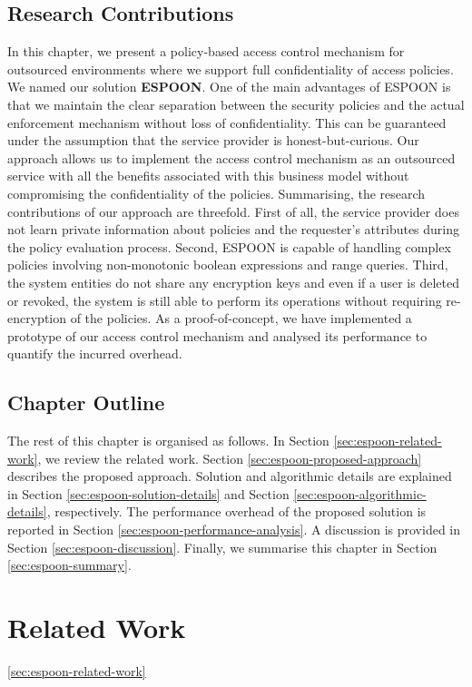\documentclass[epsfig,a4paper,11pt,titlepage]{book}
\numberwithin{algorithm}{chapter}
\begin{document}
\subsection{Research Contributions}
In this chapter, we present a policy-based access control mechanism for outsourced environments where we support full confidentiality of access policies. We named our solution \textbf{\gls{ESPOON}}. One of the main advantages of \gls{ESPOON} is that we maintain the clear separation between the security policies and the actual enforcement mechanism without loss of confidentiality. This can be guaranteed under the assumption that the service provider is honest-but-curious. Our approach allows us to implement the access control mechanism as an outsourced service with all the benefits associated with this business model without compromising the confidentiality of the policies. Summarising, the research contributions of our approach are threefold. First of all, the service provider does not learn private information about policies and the requester's attributes during the policy evaluation process. Second, \gls{ESPOON} is capable of handling complex policies involving non-monotonic boolean expressions and range queries. Third, the system entities do not share any encryption keys and even if a user is deleted or revoked, the system is still able to perform its operations without requiring re-encryption of the policies. As a proof-of-concept, we have implemented a prototype of our access control mechanism and analysed its performance to quantify the incurred overhead.

\subsection{Chapter Outline}
The rest of this chapter is organised as follows. In Section \ref{sec:espoon-related-work}, we review the related work. Section \ref{sec:espoon-proposed-approach} describes the proposed approach. Solution and algorithmic details are explained in Section \ref{sec:espoon-solution-details} and Section \ref{sec:espoon-algorithmic-details}, respectively. The performance overhead of the proposed solution is reported in Section \ref{sec:espoon-performance-analysis}. A discussion is provided in Section \ref{sec:espoon-discussion}. Finally, we summarise this chapter in Section \ref{sec:espoon-summary}.

\iffalse
\section{Related Work} \ref{sec:espoon-related-work}
\end{document}
